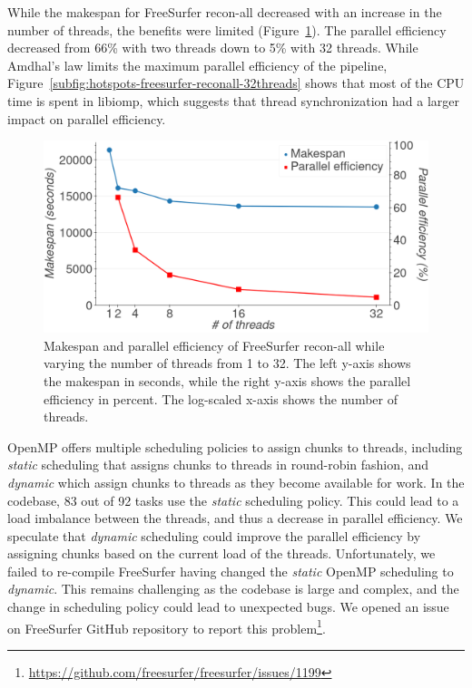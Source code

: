 \documentclass[conference]{IEEEtran}
\begin{document}
While the makespan for FreeSurfer recon-all decreased with an increase in the number of threads, the benefits were limited (Figure~\ref{fig:freesurfer-threading}). The parallel efficiency decreased from 66\% with two threads down to 5\% with 32 threads. While Amdhal's law limits the maximum parallel efficiency of the pipeline, Figure~\ref{subfig:hotspots-freesurfer-reconall-32threads} shows that most of the CPU time is spent in libiomp, which suggests that thread synchronization had a larger impact on parallel efficiency.

\begin{figure}[ht]
	\includegraphics[width=\linewidth]{figures/makespan-freesurfer.png}
	\caption{Makespan and parallel efficiency of FreeSurfer recon-all while varying the number of threads from 1 to 32. The left y-axis shows the makespan in seconds, while the right y-axis shows the parallel efficiency in percent. The log-scaled x-axis shows the number of threads.}
	\label{fig:freesurfer-threading}
\end{figure}

OpenMP offers multiple scheduling policies to assign chunks to threads, including \textit{static} scheduling that assigns chunks to threads in round-robin fashion, and \textit{dynamic} which assign chunks to threads as they become available for work. In the codebase, 83 out of 92 tasks use the \textit{static} scheduling policy. This could lead to a load imbalance between the threads, and thus a decrease in parallel efficiency. We speculate that \textit{dynamic} scheduling could improve the parallel efficiency by assigning chunks based on the current load of the threads. Unfortunately, we failed to re-compile FreeSurfer having changed the \textit{static} OpenMP scheduling to \textit{dynamic}. This remains challenging as the codebase is large and complex, and the change in scheduling policy could lead to unexpected bugs. We opened an issue on FreeSurfer GitHub repository to report this problem\footnote{\href{https://github.com/freesurfer/freesurfer/issues/1199}{https://github.com/freesurfer/freesurfer/issues/1199}}.
\end{document}
